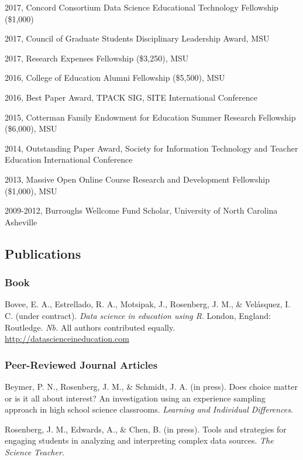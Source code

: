 \documentclass[14,]{article}
\begin{document}
2017, Concord Consortium Data Science Educational Technology Fellowship
(\$1,000)

2017, Council of Graduate Students Disciplinary Leadership Award, MSU

2017, Research Expenses Fellowship (\$3,250), MSU

2016, College of Education Alumni Fellowship (\$5,500), MSU

2016, Best Paper Award, TPACK SIG, SITE International Conference

2015, Cotterman Family Endowment for Education Summer Research
Fellowship (\$6,000), MSU

2014, Outstanding Paper Award, Society for Information Technology and
Teacher Education International Conference

2013, Massive Open Online Course Research and Development Fellowship
(\$1,000), MSU

2009-2012, Burroughs Wellcome Fund Scholar, University of North Carolina
Asheville

\hypertarget{publications}{%
\subsection{Publications}\label{publications}}

\hypertarget{book}{%
\subsubsection{Book}\label{book}}

Bovee, E. A., Estrellado, R. A., Motsipak, J., Rosenberg, J. M., \&
Velásquez, I. C. (under contract). \emph{Data science in education using
R}. London, England: Routledge. \emph{Nb.} All authors contributed
equally. \url{http://datascienceineducation.com}

\hypertarget{peer-reviewed-journal-articles}{%
\subsubsection{Peer-Reviewed Journal
Articles}\label{peer-reviewed-journal-articles}}

Beymer, P. N., Rosenberg, J. M., \& Schmidt, J. A. (in press). Does
choice matter or is it all about interest? An investigation using an
experience sampling approach in high school science classrooms.
\emph{Learning and Individual Differences}.

Rosenberg, J. M., Edwards, A., \& Chen, B. (in press). Tools and
strategies for engaging students in analyzing and interpreting complex
data sources. \emph{The Science Teacher}.
\end{document}
